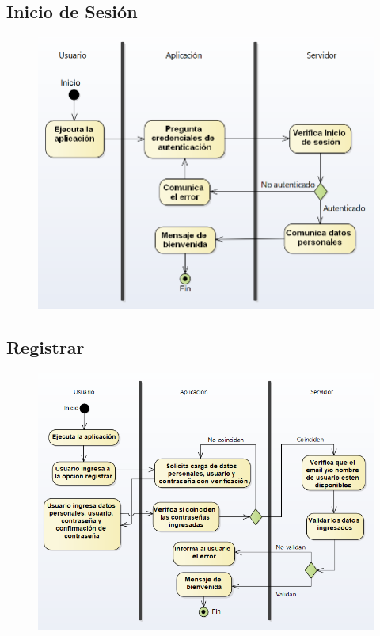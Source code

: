 \subsection{Inicio de Sesión}
\begin{figure}[H]
  \centering
    \includegraphics[width=1\textwidth]{imagenes/analisis/diagrama-actividad-inicioSesion.png}
    \label{fig:diagrama-actividad-autenticar}
\end{figure}

\subsection{Registrar}

\begin{figure}[H]
  \centering
    \includegraphics[width=1\textwidth]{imagenes/analisis/diagrama-actividad-registrar.png}
	\label{fig:diagrama-actividad-registrar}
\end{figure}

